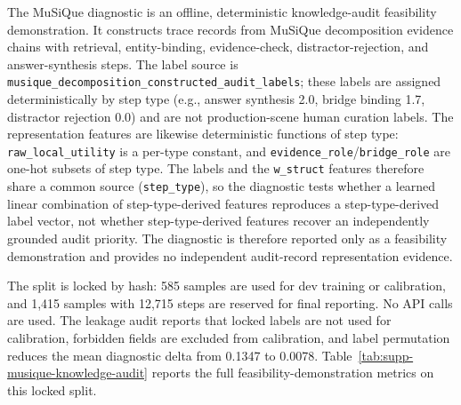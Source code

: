 \documentclass[a4paper,fleqn]{cas-sc}
\begin{document}
The MuSiQue diagnostic is an offline, deterministic knowledge-audit feasibility demonstration. It constructs trace records from MuSiQue decomposition evidence chains with retrieval, entity-binding, evidence-check, distractor-rejection, and answer-synthesis steps. The label source is \texttt{musique\_decomposition\_constructed\_audit\_labels}; these labels are assigned deterministically by step type (e.g., answer synthesis 2.0, bridge binding 1.7, distractor rejection 0.0) and are not production-scene human curation labels. The representation features are likewise deterministic functions of step type: \texttt{raw\_local\_utility} is a per-type constant, and \texttt{evidence\_role}/\texttt{bridge\_role} are one-hot subsets of step type. The labels and the \texttt{w\_struct} features therefore share a common source (\texttt{step\_type}), so the diagnostic tests whether a learned linear combination of step-type-derived features reproduces a step-type-derived label vector, not whether step-type-derived features recover an independently grounded audit priority. The diagnostic is therefore reported only as a feasibility demonstration and provides no independent audit-record representation evidence.

The split is locked by hash: 585 samples are used for dev training or calibration, and 1,415 samples with 12,715 steps are reserved for final reporting. No API calls are used. The leakage audit reports that locked labels are not used for calibration, forbidden fields are excluded from calibration, and label permutation reduces the mean diagnostic delta from 0.1347 to 0.0078. Table~\ref{tab:supp-musique-knowledge-audit} reports the full feasibility-demonstration metrics on this locked split.
\end{document}
